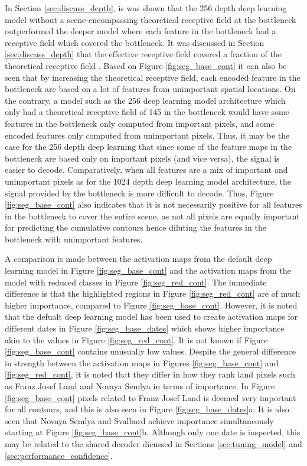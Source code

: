 \documentclass[../main/thesis]{subfiles}
\begin{document}
In Section \ref{sec:discuss_depth}, is was shown that the 256 depth deep learning model without a scene-encompassing theoretical receptive field at the bottleneck outperformed the deeper model where each feature in the bottleneck had a receptive field which covered the bottleneck. It was discussed in Section \ref{sec:discuss_depth} that the effective receptive field covered a fraction of the theoretical receptive field \citep{Luo2017}. Based on Figure \ref{fig:seg_base_cont} it can also be seen that by increasing the theoretical receptive field, each encoded feature in the bottleneck are based on a lot of features from unimportant spatial locations. On the contrary, a model such as the 256 deep learning model architecture which only had a theoretical receptive field of 145 in the bottleneck would have some features in the bottleneck only computed from important pixels, and some encoded features only computed from unimportant pixels. Thus, it may be the case for the 256 depth deep learning that since some of the feature maps in the bottleneck are based only on important pixels (and vice versa), the signal is easier to decode. Comparatively, when all features are a mix of important and unimportant pixels as for the 1024 depth deep learning model architecture, the signal provided by the bottleneck is more difficult to decode. Thus, Figure \ref{fig:seg_base_cont} also indicates that it is not necessarily positive for all features in the bottleneck to cover the entire scene, as not all pixels are equally important for predicting the cumulative contours hence diluting the features in the bottleneck with unimportant features.

A comparison is made between the activation maps from the default deep learning model in Figure \ref{fig:seg_base_cont} and the activation maps from the model with reduced classes in Figure \ref{fig:seg_red_cont}. The immediate difference is that the highlighted regions in Figure \ref{fig:seg_red_cont} are of much higher importance, compared to Figure \ref{fig:seg_base_cont}. However, it is noted that the defualt deep learning model has been used to create activation maps for different dates in Figure \ref{fig:seg_base_dates} which shows higher importance akin to the values in Figure \ref{fig:seg_red_cont}. It is not known if Figure \ref{fig:seg_base_cont} contains unusually low values. Despite the general difference in strength between the activation maps in Figures \ref{fig:seg_base_cont} and \ref{fig:seg_red_cont}, it is noted that they differ in how they rank land pixels such as Franz Josef Land and Novaya Semlya in terms of importance. In Figure \ref{fig:seg_base_cont} pixels related to Franz Josef Land is deemed very important for all contours, and this is also seen in Figure \ref{fig:seg_base_dates}a. It is also seen that Novaya Semlya and Svalbard achieve importance simultaneously starting at Figure \ref{fig:seg_base_cont}b. Although only one date is inspected, this may be related to the shared decoder dicussed in Sections \ref{sec:tuning_model} and \ref{sec:performance_confidence}. 
\end{document}
